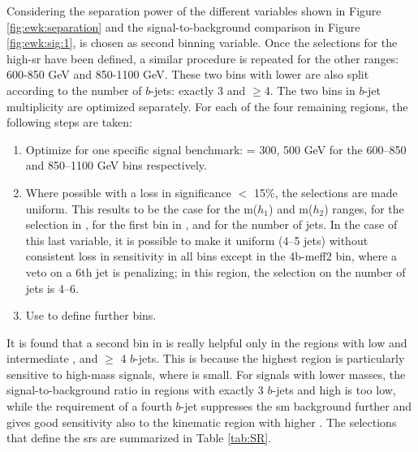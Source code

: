 Considering the separation power of the different variables shown in Figure  \ref{fig:ewk:separation} 
and the signal-to-background comparison in Figure \ref{fig:ewk:sig:1}, 
\dRmax is chosen as second binning variable. 
Once the selections for the high-\meffb \gls{sr} have been defined, 
a similar procedure is repeated for the other \meffb ranges: 600-850 GeV and 850-1100 GeV. 
These two bins with lower \meffb are also split according to the number of $b$-jets: exactly 3 and $\geq$4. 
The two bins in $b$-jet multiplicity are optimized separately. 
For each of the four remaining regions, the following steps are taken:

\begin{enumerate}
\item Optimize for one specific signal benchmark: \mhino = 300, 500 GeV for the 600--850 and 850--1100 GeV \meffb bins respectively.
\item  Where possible with a loss in significance $<$ 15\%, the selections are made uniform. 
This results to be the case for the m($h_1$) and m($h_2$) ranges, for the selection in \met, for the first bin in \dRmax, 
and for the number of jets. In the case of this last variable, it is possible to make it uniform (4--5 jets) 
without consistent loss in sensitivity in all bins except in the 4b-meff2 bin, where a veto on a 6th jet is penalizing; 
in this region, the selection on the number of jets is 4--6.
\item Use \dRmax to define further bins.
\end{enumerate}

It is found that a second bin in \dRmax is really helpful only in the regions with low and intermediate \meffb, and  $\geq$ 4 $b$-jets. 
This is because the highest \meffb region is particularly sensitive to high-mass signals, where \dRmax is small. 
For signals with lower masses, the signal-to-background ratio in regions with exactly 3 $b$-jets and high \dRmax is too low, 
while the requirement of a fourth $b$-jet suppresses the \gls{sm} background further and gives good sensitivity 
also to the kinematic region with higher \dRmax.
The selections that define the \glspl{sr} are summarized in Table \ref{tab:SR}.

